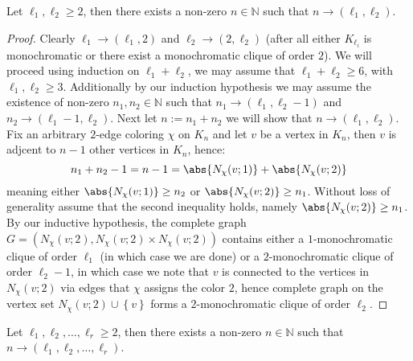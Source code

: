 \begin{theorem}\label{thm:ramsey_two_colors}
	Let $\ell_1, \ell_2 \geq 2$, then there exists a non-zero $n \in \mathbb{N}$ such that $n \to (\ell_1, \ell_2)$.
\end{theorem}
\begin{proof}
	Clearly $\ell_1 \to (\ell_1, 2)$ and $\ell_2 \to (2, \ell_2)$ (after all either $K_{\ell_{i}}$ is monochromatic or there exist a monochromatic clique of order $2$). We will proceed using induction on $\ell_1 + \ell_{2}$, we may assume that $\ell_1 + \ell_2 \geq 6$, with $\ell_1, \ell_2 \geq 3$.
	Additionally by our induction hypothesis we may assume the existence of non-zero $n_1, n_2 \in \mathbb{N}$ such that $n_1 \to (\ell_1, \ell_2 - 1)$ and $n_2 \to (\ell_1 - 1, \ell_2)$. Next let $n := n_1 + n_2$ we will show that $n \to (\ell_1, \ell_2)$. Fix an arbitrary $2$-edge coloring $\chi$ on $K_n$ and let $v$ be a vertex in $K_n$, then $v$ is adjcent to $n - 1$ other vertices in $K_{n}$, hence:
	\begin{equation*}
		n_1 + n_2 - 1 = n - 1 = \abs{N_{\chi}(v; 1)} + \abs{N_{\chi}(v; 2)}
	\end{equation*}
	meaning either $\abs{N_{\chi}(v; 1)} \geq n_2$ or $\abs{N_{\chi}(v; 2)} \geq n_1$. Without loss of generality assume that the second inequality holds, namely $\abs{N_{\chi}(v; 2)} \geq n_1$. By our inductive hypothesis, the complete graph $G = (N_{\chi}(v; 2), N_{\chi}(v; 2) \times N_{\chi}(v; 2))$ contains either a $1$-monochromatic clique of order $\ell_{1}$ (in which case we are done) or a $2$-monochromatic clique of order $\ell_{2} - 1$, in which case we note that $v$ is connected to the vertices in $N_{\chi}(v; 2)$ via edges that $\chi$ assigns the color $2$, hence complete graph on the vertex set $N_{\chi}(v; 2) \cup \left\{v\right\}$ forms a $2$-monochromatic clique of order $\ell_{2}$.
\end{proof}

\begin{corollary}\label{cor:ramsey_for_arbitarily_many_colors}
	Let $\ell_1, \ell_2, \ldots, \ell_r \geq 2$, then there exists a non-zero $n \in \mathbb{N}$ such that $n \to (\ell_1, \ell_2, \ldots, \ell_{r})$.
\end{corollary}

